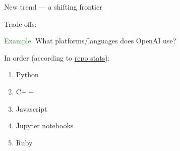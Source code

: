 \documentclass[
    xcolor={svgnames,dvipsnames},
    hyperref={colorlinks, citecolor=DeepPink4, linkcolor=DarkRed, urlcolor=DarkBlue}
    ]{beamer}  %
\newcommand{\Eg}{\textcolor{ForestGreen}{Example. }}
\newcommand{\1}{\mathbbm 1}
\begin{document}
\begin{frame}[fragile]

    New trend --- a shifting frontier

\end{frame}




\begin{frame}

    Trade-offs:

    \begin{figure}
       \begin{center}
       \end{center}
    \end{figure}

\end{frame}





\begin{frame}

    \Eg What platforms/languages does OpenAI use?

        \vspace{0.5em}
    In order (according to  \href{https://github.com/openai}{repo stats}):

    \begin{enumerate}
        \item Python
        \item C$++$
        \item Javascript
        \item Jupyter notebooks
        \item Ruby
    \end{enumerate}

\end{frame}
\end{document}
